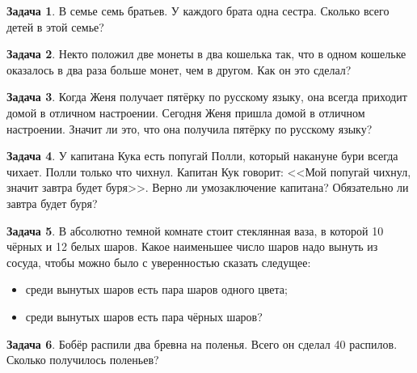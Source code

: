 \documentclass[14pt, a4paper]{extarticle}
\theoremstyle{definition}
\newtheorem{task}{Задача}
\begin{document}
\begin{task}
    В семье семь братьев. У каждого брата одна сестра. Сколько всего детей в этой семье?
\end{task}

\begin{task}
    Некто положил две монеты в два кошелька так, что в одном кошельке оказалось в два раза больше монет,
    чем в другом. Как он это сделал?
\end{task}

\begin{task}
Когда Женя получает пятёрку по русскому языку, она всегда приходит домой в отличном настроении.
Сегодня Женя пришла домой в отличном настроении. Значит ли это, что 
она получила пятёрку по русскому языку?
\end{task}

\begin{task}
У капитана Кука есть попугай Полли, который накануне бури всегда чихает. Полли только что чихнул.
Капитан Кук говорит: <<Мой попугай чихнул, значит завтра будет буря>>.
Верно ли умозаключение капитана? Обязательно ли завтра будет буря?
\end{task}

\begin{task}
    В абсолютно темной комнате стоит стеклянная ваза, в которой 10 чёрных и 12 белых шаров.
    Какое наименьшее число шаров надо вынуть из сосуда, чтобы можно было с уверенностью 
    сказать следущее:
    \begin{itemize}
        \item среди вынутых шаров есть пара шаров одного цвета;
        \item среди вынутых шаров есть пара чёрных шаров?
    \end{itemize}
\end{task}

\begin{task}
    Бобёр распили два бревна на поленья. Всего он сделал 40 распилов.
    Сколько получилось поленьев?
\end{task}
\end{document}
